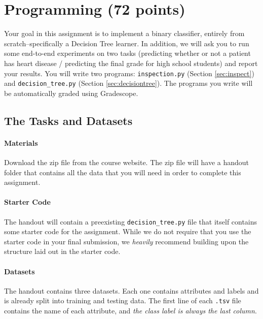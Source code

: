 \documentclass[11pt,addpoints,answers]{exam}
\begin{document}
\section{Programming (72 points)}

Your goal in this assignment is to implement a binary classifier, entirely from scratch--specifically a Decision Tree learner. In addition, we will ask you to run some end-to-end experiments on two tasks (predicting whether or not a patient has heart disease / predicting the final grade for high school students) and report your results.
%
You will write two programs: \texttt{inspection.py} (Section \ref{sec:inspect}) and \texttt{decision\_tree.py} (Section \ref{sec:decisiontree}). The programs you write will be automatically graded using Gradescope.

\subsection{The Tasks and Datasets}
\label{sec:data}

\paragraph{Materials} Download the zip file from the course website. The zip file will have a handout folder that contains all the data that you will need in order to complete this assignment.

\paragraph{Starter Code} The handout will contain a preexisting \texttt{decision\_tree.py} file that itself contains some starter code for the assignment. While we do not require that you use the starter code in your final submission, we \emph{heavily} recommend building upon the structure laid out in the starter code.

\paragraph{Datasets}

The handout contains three datasets. Each one contains attributes and labels and is already split into training and testing data. The first line of each \lstinline{.tsv} file contains the name of each attribute, and \emph{the class label is always the last column}.
\end{document}
